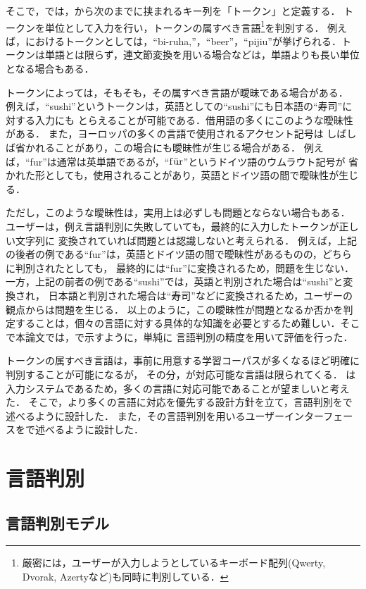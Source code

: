 \documentclass[japanese]{jnlp_1.4}
\newcommand{\name}{}
\newcommand{\secref}[1]{}
\newcommand{\figref}[1]{}
\newcommand{\delim}{}
\begin{document}
そこで，{\name}では，{\delim}から次の{\delim}までに挟まれるキー列を「トークン」と定義する．
トークンを単位として入力を行い，トークンの属すべき言語\footnote{厳密には，ユーザーが入力しようとしているキーボード配列(Qwerty, Dvorak, Azertyなど)も同時に判別している．}を判別する．
例えば，\figref{fig:toyota}におけるトークンとしては，``bi-ruha,''，``beer''，``pijiu''が挙げられる．トークンは単語とは限らず，連文節変換を用いる場合などは，単語よりも長い単位となる場合もある．

トークンによっては，そもそも，その属すべき言語が曖昧である場合がある．
例えば，``sushi''というトークンは，英語としての``sushi''にも日本語の``寿司''に対する入力にも
とらえることが可能である．借用語の多くにこのような曖昧性がある．
また，ヨーロッパの多くの言語で使用されるアクセント記号は
しばしば省かれることがあり，この場合にも曖昧性が生じる場合がある．
例えば，``fur''は通常は英単語であるが，``$\rm{f\ddot{u}r}$''というドイツ語のウムラウト記号が
省かれた形としても，使用されることがあり，英語とドイツ語の間で曖昧性が生じる．

ただし，このような曖昧性は，実用上は必ずしも問題とならない場合もある．
ユーザーは，例え言語判別に失敗していても，最終的に入力したトークンが正しい文字列に
変換されていれば問題とは認識しないと考えられる．
例えば，上記の後者の例である``fur''は，英語とドイツ語の間で曖昧性があるものの，どちらに判別されたとしても，
最終的には``fur''に変換されるため，問題を生じない．
一方，上記の前者の例である``sushi''では，英語と判別された場合は``sushi''と変換され，
日本語と判別された場合は``寿司''などに変換されるため，ユーザーの観点からは問題を生じる．
以上のように，この曖昧性が問題となるか否かを判定することは，個々の言語に対する具体的な知識を必要とするため難しい．そこで本論文では，\secref{sec:evaluation}で示すように，単純に
言語判別の精度を用いて評価を行った．

トークンの属すべき言語は，事前に用意する学習コーパスが多くなるほど明確に判別することが可能になるが，
その分，{\name}が対応可能な言語は限られてくる．
{\name}は入力システムであるため，多くの言語に対応可能であることが望ましいと考えた．
そこで，より多くの言語に対応を優先する設計方針を立て，言語判別を\secref{sec:model}で述べるように設計した．
また，その言語判別を用いるユーザーインターフェースを\secref{sec:design}で述べるように設計した．


\section{言語判別} 
\label{sec:model} 


\subsection{言語判別モデル}
\end{document}
